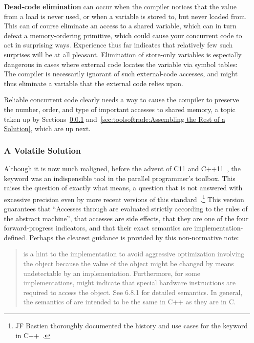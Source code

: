 {\bf Dead-code elimination} can occur when the compiler notices that
the value from a load is never used, or when a variable is stored to,
but never loaded from.
This can of course eliminate an access to a shared variable, which
can in turn defeat a memory-ordering primitive, which could cause your
concurrent code to act in surprising ways.
Experience thus far indicates that relatively few such surprises will
be at all pleasant.
Elimination of store-only variables is especially dangerous in cases
where external code locates the variable via symbol tables: The
compiler is necessarily ignorant of such external-code accesses, and
might thus eliminate a variable that the external code relies upon.

Reliable concurrent code clearly needs a way to cause the compiler to
preserve the number, order, and type of important accesses to shared
memory, a topic taken up by
Sections~\ref{sec:toolsoftrade:A Volatile Solution}
and~\ref{sec:toolsoftrade:Assembling the Rest of a Solution},
which are up next.

\subsubsection{A Volatile Solution}
\label{sec:toolsoftrade:A Volatile Solution}

Although it is now much maligned, before the advent of C11 and
C++11~\cite{PeteBecker2011N3242}, the  keyword was an
indispensible tool in the parallel programmer's toolbox.
This raises the question of exactly what  means,
a question that is not answered with excessive precision even
by more recent versions of this standard~\cite{RichardSmith2019N4800}.\footnote{
	JF Bastien thoroughly documented the history and use cases
	for the  keyword in
	C++~\cite{JFBastien2018DeprecatingVolatile}.}
This version guarantees that ``Accesses through 
 are evaluated strictly according to the rules of the
abstract machine'',
that  accesses are side effects,
that they are one of the four forward-progress indicators,
and that their exact semantics are implementation-defined.
Perhaps the clearest guidance is provided by this non-normative note:

\begin{quote}
	 is a hint to the implementation to avoid
	aggressive optimization involving the object because the value
	of the object might be changed by means undetectable by an
	implementation.
	Furthermore, for some implementations,  might indicate
	that special hardware instructions are required to access
	the object.
	See 6.8.1 for detailed semantics.
	In general, the semantics of  are intended to be the
	same in C++ as they are in C.
\end{quote}

